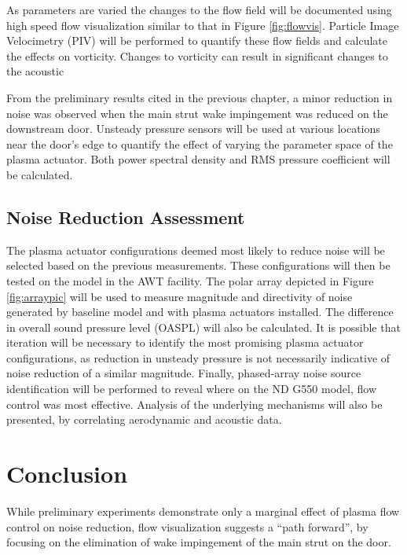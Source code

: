 As parameters are varied the changes to the flow field will be documented using high speed flow visualization similar to that in Figure \ref{fig:flowvis}. Particle Image Velocimetry (PIV) will be performed to quantify these flow fields and calculate the effects on vorticity. Changes to vorticity can result in significant changes to the acoustic 

From the preliminary results cited in the previous chapter, a minor reduction in noise was observed when the main strut wake impingement was reduced on the downstream door. Unsteady pressure sensors will be used at various locations near the door's edge to quantify the effect of varying the parameter space of the plasma actuator. Both power spectral density and RMS pressure coefficient will be calculated.

\subsection{Noise Reduction Assessment}
The plasma actuator configurations deemed most likely to reduce noise will be selected based on the previous measurements. These configurations will then be tested on the model in the AWT facility. 
The polar array depicted in Figure \ref{fig:arraypic} will be used to measure magnitude and directivity of noise generated by baseline model and with plasma actuators installed. The difference in overall sound pressure level (OASPL) will also be calculated.
It is possible that iteration will be necessary to identify the most promising plasma actuator configurations, as reduction in unsteady pressure is not necessarily indicative of noise reduction of a similar magnitude. 
Finally, phased-array noise source identification will be performed to reveal where on the ND G550 model, flow control was most effective. Analysis of the underlying mechanisms will also be presented, by correlating aerodynamic and acoustic data.

\section{Conclusion}
While preliminary experiments demonstrate only a marginal effect of plasma flow control on noise reduction, flow visualization suggests a ``path forward'', by focusing on the elimination of wake impingement of the main strut on the door. 